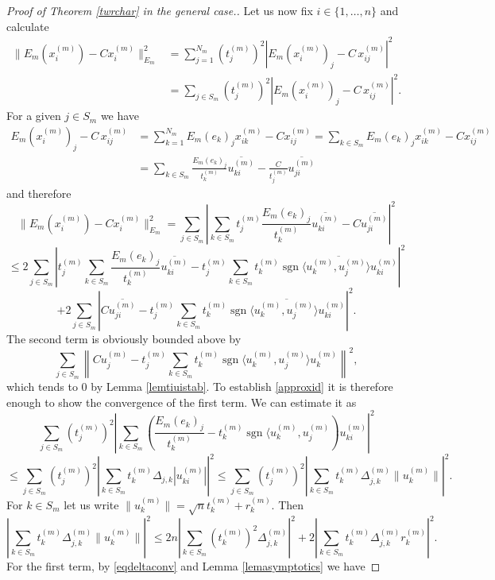 \documentclass[12pt, reqno]{amsart}
\theoremstyle{definition}
\theoremstyle{remark}
\numberwithin{equation}{section}
\DeclareMathOperator{\sgn}{sgn}
\begin{document}
\begin{proof}[Proof of Theorem \ref{twrchar} in the general case.]
Let us now fix $i \in \{1, \ldots, n\}$ and calculate
\begin{align*}
\|E_m(x_i^{(m)})-Cx_i^{(m)}\|^2_{E_m} &=  \sum_{j=1}^{N_m} (t_j^{(m)})^2 \left| E_m(x_i^{(m)})_j - C\,x_{ij}^{(m)} \right|^2 \\
 &=\sum_{j \in S_m} (t_j^{(m)})^2 \left| E_m(x_i^{(m)})_j - C\,x_{ij}^{(m)} \right|^2.
\end{align*}
 For a given $j \in S_m$ we have
\begin{align*}
E_m(x_i^{(m)})_j - C\,x_{ij}^{(m)} &= \sum_{k=1}^{N_m}E_m(e_k)_jx_{ik}^{(m)} - Cx_{ij}^{(m)}=\sum_{k \in S_m}E_m(e_k)_jx_{ik}^{(m)} - Cx_{ij}^{(m)} \\
 &=\sum_{k \in S_m}\frac{E_m(e_k)_j}{t^{(m)}_k} \overline{u_{ki}^{(m)}} - \frac{C}{t^{(m)}_j}{\overline{u_{ji}^{(m)}}}
\end{align*}
 and therefore
 $$\|E_m(x_i^{(m)})-Cx_i^{(m)}\|^2_{E_m} = \sum_{j \in S_m} \left | \sum_{k \in S_m} t^{(m)}_j\frac{E_m(e_k)_j}{t^{(m)}_k} \overline{u_{ki}^{(m)}} - C{\overline{u_{ji}^{(m)}}} \right |^2 $$
 $$\leq 2\sum_{j \in S_m} \left |t^{(m)}_j\sum_{k \in S_m} \frac{E_m(e_k)_j}{t^{(m)}_k} \overline{u_{ki}^{(m)}} -  t_j^{(m)} \sum_{k \in S_m} t_k^{(m)} \overline{ \sgn \langle u_k^{(m)}, u_j^{(m)}\rangle u_{ki}^{(m)}}  \right |^2$$
 $$+2\sum_{j \in S_m}\left |C{\overline{u_{ji}^{(m)}}}  -  t_j^{(m)} \sum_{k \in S_m} t_k^{(m)}\overline{\sgn \langle u_k^{(m)}, u_j^{(m)}\rangle u_{ki}^{(m)}}  \right |^2.$$
The second term is obviously bounded above by
$$ \sum_{j \in S_m} \left \|C{u_{j}^{(m)}}  -  t_j^{(m)} \sum_{k \in S_m} t_k^{(m)} \sgn \langle u_k^{(m)}, u_j^{(m)}\rangle u_{k}^{(m)} \right \|^2,$$
which tends to $0$ by Lemma \ref{lemtiuistab}. To establish \eqref{approxid} it is therefore enough to show the convergence of the first term. We can estimate it as
$$\sum_{j \in S_m} (t^{(m)}_j)^2 \left | \sum_{k \in S_m} \left ( \frac{E_m(e_k)_j}{t^{(m)}_k} - t_k^{(m)} \sgn \langle u_k^{(m)}, u_j^{(m)} \right )u^{(m)}_{ki} \right |^2$$
$$\leq \sum_{j \in S_m} (t^{(m)}_j)^2 \left | \sum_{k \in S_m} t^{(m)}_k \Delta_{j, k}|u^{(m)}_{ki}| \right |^2 \leq \sum_{j \in S_m} (t^{(m)}_j)^2 \left | \sum_{k \in S_m} t^{(m)}_k \Delta^{(m)}_{j, k}\|u_k^{(m)}\| \right |^2.$$
For $k \in S_m$ let us write $\|u^{(m)}_k\|=\sqrt{n}t^{(m)}_k + r^{(m)}_k$. Then
$$\left | \sum_{k \in S_m} t^{(m)}_k \Delta^{(m)}_{j, k}\|u^{(m)}_k\| \right |^2 \leq 2n \left | \sum_{k \in S_m} (t^{(m)}_k)^2 \Delta^{(m)}_{j, k} \right |^2 + 2 \left | \sum_{k \in S_m} t^{(m)}_k \Delta^{(m)}_{j, k}r^{(m)}_k \right |^2.$$
For the first term, by \eqref{eqdeltaconv} and Lemma \ref{lemasymptotics} we have

\end{proof}
\end{document}
